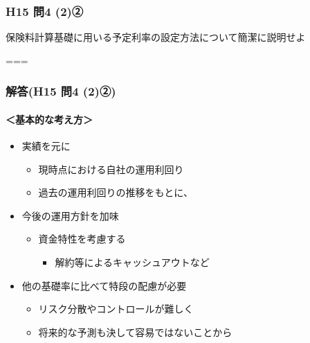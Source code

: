\documentclass[]{article}
\begin{document}
\hypertarget{h15-ux554f4-2ux2461}{%
\subsubsection{H15 問4 (2)②}\label{h15-ux554f4-2ux2461}}

保険料計算基礎に用いる予定利率の設定方法について簡潔に説明せよ

===

\hypertarget{ux89e3ux7b54h15-ux554f4-2ux2461}{%
\subsubsection{解答(H15 問4
(2)②)}\label{ux89e3ux7b54h15-ux554f4-2ux2461}}

\hypertarget{ux57faux672cux7684ux306aux8003ux3048ux65b9}{%
\paragraph{＜基本的な考え方＞}\label{ux57faux672cux7684ux306aux8003ux3048ux65b9}}

\begin{itemize}
\tightlist
\item
  実績を元に

  \begin{itemize}
  \tightlist
  \item
    現時点における自社の運用利回り
  \item
    過去の運用利回りの推移をもとに、
  \end{itemize}
\item
  今後の運用方針を加味

  \begin{itemize}
  \tightlist
  \item
    資金特性を考慮する

    \begin{itemize}
    \tightlist
    \item
      解約等によるキャッシュアウトなど
    \end{itemize}
  \end{itemize}
\item
  他の基礎率に比べて特段の配慮が必要

  \begin{itemize}
  \tightlist
  \item
    リスク分散やコントロールが難しく
  \item
    将来的な予測も決して容易ではないことから
  \end{itemize}
\end{itemize}
\end{document}
